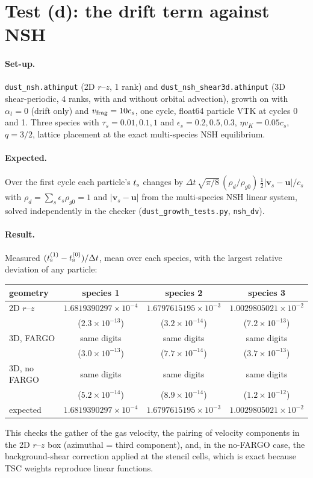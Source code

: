 \documentclass[11pt]{article}
\newcommand{\code}[1]{\texttt{#1}}
\newcommand{\file}[1]{\texttt{\small #1}}
\newcommand{\ts}{t_{\rm s}}
\newcommand{\vf}{v_{\rm frag}}
\begin{document}
\section{Test (d): the drift term against NSH}

\paragraph{Set-up.} \file{dust\_nsh.athinput} (2D $r$--$z$, 1 rank) and
\file{dust\_nsh\_shear3d.athinput} (3D shear-periodic, 4 ranks, with and without
orbital advection), growth on with $\alpha_t=0$ (drift only) and $\vf=10c_s$, one cycle,
float64 particle VTK at cycles 0 and 1. Three species with $\tau_s=0.01, 0.1, 1$ and
$\epsilon_s=0.2, 0.5, 0.3$, $\eta v_K=0.05c_s$, $q=3/2$, lattice placement at the exact
multi-species NSH equilibrium.

\paragraph{Expected.} Over the first cycle each particle's $\ts$ changes by
$\Delta t\,\sqrt{\pi/8}\,(\rho_d/\rho_{g0})\,\tfrac12|\mathbf v_s-\mathbf u|/c_s$ with
$\rho_d=\sum_s\epsilon_s\rho_{g0}=1$ and $|\mathbf v_s-\mathbf u|$ from the
multi-species NSH linear system, solved independently in the checker
(\file{dust\_growth\_tests.py}, \code{nsh\_dv}).

\paragraph{Result.} Measured $(\ts^{(1)}-\ts^{(0)})/\Delta t$, mean over each species,
with the largest relative deviation of any particle:
\begin{center}
\begin{tabular}{lccc}
\toprule
geometry & species 1 & species 2 & species 3 \\
\midrule
2D $r$--$z$ & $1.6819390297\times10^{-4}$ & $1.6797615195\times10^{-3}$ &
  $1.0029805021\times10^{-2}$ \\
 & ($2.3\times10^{-13}$) & ($3.2\times10^{-14}$) & ($7.2\times10^{-13}$) \\
3D, FARGO & same digits & same digits & same digits \\
 & ($3.0\times10^{-13}$) & ($7.7\times10^{-14}$) & ($3.7\times10^{-13}$) \\
3D, no FARGO & same digits & same digits & same digits \\
 & ($5.2\times10^{-14}$) & ($8.9\times10^{-14}$) & ($1.2\times10^{-12}$) \\
\midrule
expected & $1.6819390297\times10^{-4}$ & $1.6797615195\times10^{-3}$ &
  $1.0029805021\times10^{-2}$ \\
\bottomrule
\end{tabular}
\end{center}
This checks the gather of the gas velocity, the pairing of velocity components in the
2D $r$--$z$ box (azimuthal = third component), and, in the no-FARGO case, the
background-shear correction applied at the stencil cells, which is exact because TSC
weights reproduce linear functions.
\end{document}
